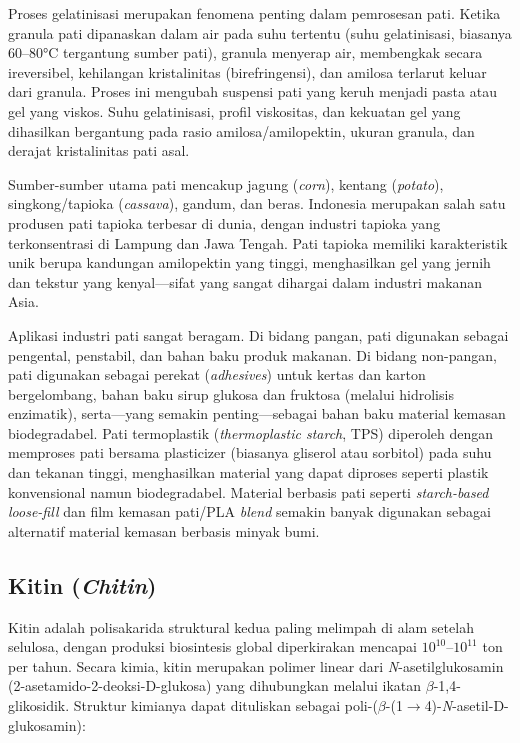 \documentclass[12pt,a4paper,openany]{book}
\begin{document}
Proses gelatinisasi merupakan fenomena penting dalam pemrosesan pati. Ketika granula pati dipanaskan dalam air pada suhu tertentu (suhu gelatinisasi, biasanya 60--80°C tergantung sumber pati), granula menyerap air, membengkak secara ireversibel, kehilangan kristalinitas (birefringensi), dan amilosa terlarut keluar dari granula. Proses ini mengubah suspensi pati yang keruh menjadi pasta atau gel yang viskos. Suhu gelatinisasi, profil viskositas, dan kekuatan gel yang dihasilkan bergantung pada rasio amilosa/amilopektin, ukuran granula, dan derajat kristalinitas pati asal.

Sumber-sumber utama pati mencakup jagung (\textit{corn}), kentang (\textit{potato}), singkong/tapioka (\textit{cassava}), gandum, dan beras. Indonesia merupakan salah satu produsen pati tapioka terbesar di dunia, dengan industri tapioka yang terkonsentrasi di Lampung dan Jawa Tengah. Pati tapioka memiliki karakteristik unik berupa kandungan amilopektin yang tinggi, menghasilkan gel yang jernih dan tekstur yang kenyal---sifat yang sangat dihargai dalam industri makanan Asia.

Aplikasi industri pati sangat beragam. Di bidang pangan, pati digunakan sebagai pengental, penstabil, dan bahan baku produk makanan. Di bidang non-pangan, pati digunakan sebagai perekat (\textit{adhesives}) untuk kertas dan karton bergelombang, bahan baku sirup glukosa dan fruktosa (melalui hidrolisis enzimatik), serta---yang semakin penting---sebagai bahan baku material kemasan biodegradabel. Pati termoplastik (\textit{thermoplastic starch}, TPS) diperoleh dengan memproses pati bersama plasticizer (biasanya gliserol atau sorbitol) pada suhu dan tekanan tinggi, menghasilkan material yang dapat diproses seperti plastik konvensional namun biodegradabel. Material berbasis pati seperti \textit{starch-based loose-fill} dan film kemasan pati/PLA \textit{blend} semakin banyak digunakan sebagai alternatif material kemasan berbasis minyak bumi.

\subsection{Kitin (\textit{Chitin})}
\label{subsec:kitin}

Kitin adalah polisakarida struktural kedua paling melimpah di alam setelah selulosa, dengan produksi biosintesis global diperkirakan mencapai $10^{10}$--$10^{11}$ ton per tahun. Secara kimia, kitin merupakan polimer linear dari \textit{N}-asetilglukosamin (2-asetamido-2-deoksi-D-glukosa) yang dihubungkan melalui ikatan $\beta$-1,4-glikosidik. Struktur kimianya dapat dituliskan sebagai poli-($\beta$-(1$\rightarrow$4)-\textit{N}-asetil-D-glukosamin):
\end{document}
